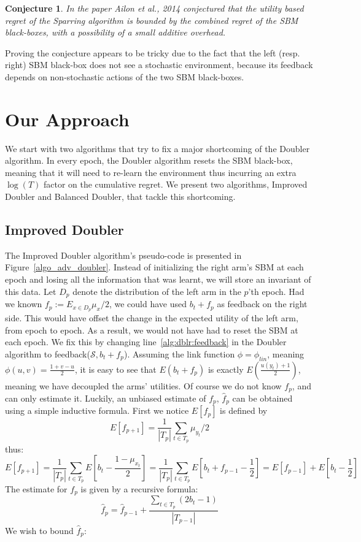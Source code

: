 \documentclass[MSc,beforeExam]{iitcsthesis}
\newtheorem{conjecture}{Conjecture}
\begin{document}
	\begin{conjecture}
 		In the paper Ailon et al., 2014 conjectured that the utility based regret of the Sparring algorithm is bounded by the combined regret of the SBM black-boxes, with a possibility of a small  additive overhead.
 	\end{conjecture}
 	
 	Proving the conjecture appears to be tricky due to the fact
that the left (resp. right) SBM black-box does not see a stochastic environment, because its feedback depends on non-stochastic actions of the two SBM black-boxes. 

\chapter{Our Approach}
We start with two algorithms that try to fix a major shortcoming of the Doubler algorithm. In every epoch, the Doubler algorithm resets the SBM black-box, meaning that it will need to re-learn the environment thus incurring an extra $\log(T)$ factor on the cumulative regret.
	We present two algorithms, Improved Doubler and Balanced Doubler, that tackle this shortcoming.
	
	\section{Improved Doubler}
	The Improved Doubler algorithm's pseudo-code is presented in Figure~\ref{algo_adv_doubler}.
	Instead of initializing the right arm's SBM at each epoch and losing all the information that was learnt, we will store an invariant of this data.
	Let $D_p$ denote the distribution of the left arm in the $p$'th epoch.
	Had we known $f_p := E_{x\in D_p} \mu_{x}/2$, we could have used $b_t + f_p$ as feedback on the right side.
	This would have offset the change in the expected utility of the left arm, from epoch to epoch.
	As a result, we would not have had to reset the SBM at each epoch.
	We fix this by changing line~\ref{alg:dblr:feedback} in the Doubler algorithm to feedback($\mathcal{S}, b_t + f_p $).
	Assuming the link function $\phi = \phi_{lin}$, meaning $\phi(u,v) = \frac{1+v-u}{2}$, it is easy to see that $E(b_t + f_p )$ is exactly $E(\frac{u(y_t)+1}{2})$, meaning we have decoupled the arms' utilities.
	Of course we do not know $f_p$, and can only estimate it.
	Luckily, an unbiased estimate of $f_p$, $\hat{f}_p$ can be obtained using a simple inductive formula.
	First we notice $E[f_p]$ is defined by 
	\begin{equation}
	E[f_{p+1}] = \frac{1}{|T_p|}\sum\limits_{t\in T_p} \mu_{y_t}/2
	\end{equation}
	thus:
	$$
	E[f_{p+1} ]= 
		\frac{1}{|T_p|}\sum\limits_{t\in T_p} E[b_t - \frac{1-\mu_{x_t}}{2}] = \frac{1}{|T_p|}\sum\limits_{t\in T_p} E[b_t + f_{p-1}-\frac{1}{2}] = E[f_{p-1} ]+E[b_t -\frac{1}{2}]
	$$
	The estimate for $f_p$ is given by a recursive formula:
	\begin{equation}
	\hat{f}_p=\hat{f}_{p-1} + \frac{\sum\limits_{t\in T_p} (2b_t -1)}{|T_{p-1}|}
	\end{equation}
	We wish to bound $\hat{f}_p$:
	
\end{document}
